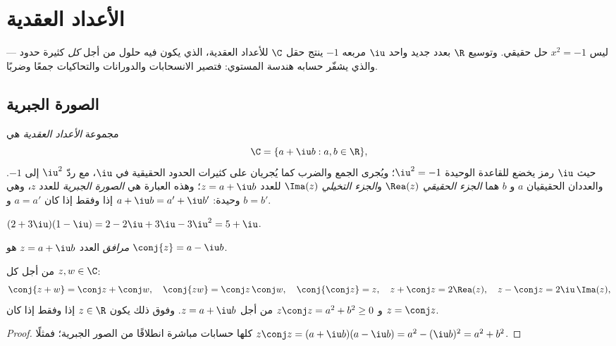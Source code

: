 \chapter{الأعداد العقدية}\label{ch:g12:complex}

ليس  $x^2 = -1$ حل حقيقي. وتوسيع $\R$ بعدد جديد
واحد $\iu$ مربعه $-1$ ينتج حقل $\C$ للأعداد
العقدية، الذي يكون فيه حلول من أجل \emph{كل}  كثيرة حدود ---
والذي يشفّر حسابه هندسة المستوي: فتصير الانسحابات والدورانات
والتحاكيات جمعًا وضربًا.

\section{الصورة الجبرية}

\begin{definition}\label{def:g12:complex:def}
مجموعة \emph{الأعداد العقدية} هي
\[
\C = \{a + \iu b : a, b \in \R\},
\]
حيث $\iu$ رمز يخضع للقاعدة الوحيدة $\iu^2 = -1$؛ ويُجرى الجمع
والضرب كما يُجريان على كثيرات الحدود الحقيقية في $\iu$، مع ردّ
$\iu^2$ إلى $-1$. والعددان الحقيقيان $a$ و $b$ هما \emph{الجزء الحقيقي}
$\Rea(z)$ و\emph{الجزء التخيلي} $\Ima(z)$ للعدد $z = a + \iu b$؛ وهذه
العبارة هي \emph{الصورة الجبرية} للعدد $z$، وهي وحيدة:
$a + \iu b = a' + \iu b'$ إذا وفقط إذا كان $a = a'$ و $b = b'$.
\end{definition}

\begin{example}
$(2 + 3\iu)(1 - \iu) = 2 - 2\iu + 3\iu - 3\iu^2 = 5 + \iu$.
\end{example}

\begin{definition}[المرافق]\label{def:g12:complex:conjugate}
\emph{مرافق} العدد $z = a + \iu b$ هو
$\conj{z} = a - \iu b$.
\end{definition}

\begin{proposition}\label{prop:g12:complex:conjugate}
من أجل كل $z, w \in \C$:
\[
\conj{z + w} = \conj z + \conj w, \quad
\conj{zw} = \conj z\,\conj w, \quad
\conj{\conj z} = z, \quad
z + \conj z = 2\Rea(z), \quad
z - \conj z = 2\iu\,\Ima(z),
\]
و $z\conj z = a^2 + b^2 \geq 0$ من أجل $z = a + \iu b$. وفوق ذلك يكون $z \in \R$
إذا وفقط إذا كان $z = \conj z$.
\end{proposition}

\begin{proof}
كلها حسابات مباشرة انطلاقًا من الصور الجبرية؛ فمثلًا
$z\conj z = (a + \iu b)(a - \iu b) = a^2 - (\iu b)^2 = a^2 + b^2$.
\end{proof}

